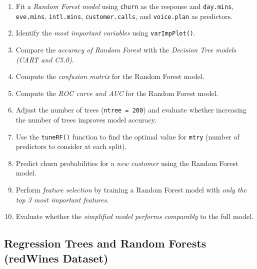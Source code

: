\documentclass[
]{book}
\newcommand{\passthrough}[1]{#1}
\providecommand{\tightlist}{%
  \setlength{\itemsep}{0pt}\setlength{\parskip}{0pt}}
\theoremstyle{definition}
\theoremstyle{definition}
\theoremstyle{definition}
\theoremstyle{definition}
\theoremstyle{remark}
\begin{document}
\begin{enumerate}
\def\labelenumi{\arabic{enumi}.}
\setcounter{enumi}{27}
\tightlist
\item
  Fit a \emph{Random Forest model} using \passthrough{\lstinline!churn!} as the response and \passthrough{\lstinline!day.mins!}, \passthrough{\lstinline!eve.mins!}, \passthrough{\lstinline!intl.mins!}, \passthrough{\lstinline!customer.calls!}, and \passthrough{\lstinline!voice.plan!} as predictors.\\
\item
  Identify the \emph{most important variables} using \passthrough{\lstinline!varImpPlot()!}.\\
\item
  Compare the \emph{accuracy of Random Forest} with the \emph{Decision Tree models (CART and C5.0)}.\\
\item
  Compute the \emph{confusion matrix} for the Random Forest model.\\
\item
  Compute the \emph{ROC curve and AUC} for the Random Forest model.\\
\item
  Adjust the number of trees (\passthrough{\lstinline!ntree = 200!}) and evaluate whether increasing the number of trees improves model accuracy.\\
\item
  Use the \passthrough{\lstinline!tuneRF()!} function to find the optimal value for \passthrough{\lstinline!mtry!} (number of predictors to consider at each split).\\
\item
  Predict churn probabilities for a \emph{new customer} using the Random Forest model.\\
\item
  Perform \emph{feature selection} by training a Random Forest model with \emph{only the top 3 most important features}.\\
\item
  Evaluate whether the \emph{simplified model performs comparably} to the full model.
\end{enumerate}

\subsection*{Regression Trees and Random Forests (redWines Dataset)}\label{regression-trees-and-random-forests-redwines-dataset}
\end{document}
